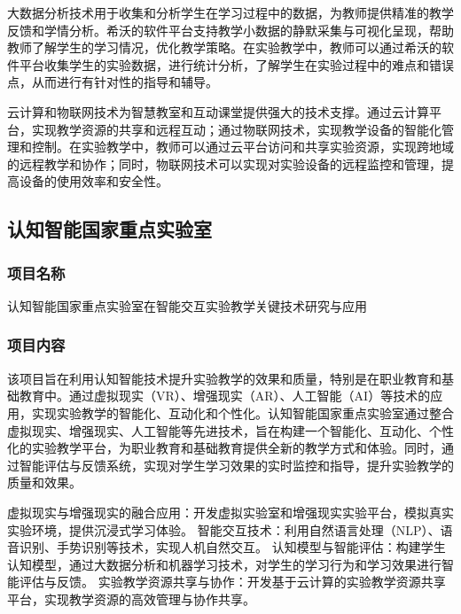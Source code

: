 大数据分析技术用于收集和分析学生在学习过程中的数据，为教师提供精准的教学反馈和学情分析。希沃的软件平台支持教学小数据的静默采集与可视化呈现，帮助教师了解学生的学习情况，优化教学策略。在实验教学中，教师可以通过希沃的软件平台收集学生的实验数据，进行统计分析，了解学生在实验过程中的难点和错误点，从而进行有针对性的指导和辅导。

云计算和物联网技术为智慧教室和互动课堂提供强大的技术支撑。通过云计算平台，实现教学资源的共享和远程互动；通过物联网技术，实现教学设备的智能化管理和控制。在实验教学中，教师可以通过云平台访问和共享实验资源，实现跨地域的远程教学和协作；同时，物联网技术可以实现对实验设备的远程监控和管理，提高设备的使用效率和安全性。

\subsection{认知智能国家重点实验室}

\subsubsection{项目名称}

认知智能国家重点实验室在智能交互实验教学关键技术研究与应用

\subsubsection{项目内容}


该项目旨在利用认知智能技术提升实验教学的效果和质量，特别是在职业教育和基础教育中。通过虚拟现实（VR）、增强现实（AR）、人工智能（AI）等技术的应用，实现实验教学的智能化、互动化和个性化。认知智能国家重点实验室通过整合虚拟现实、增强现实、人工智能等先进技术，旨在构建一个智能化、互动化、个性化的实验教学平台，为职业教育和基础教育提供全新的教学方式和体验。同时，通过智能评估与反馈系统，实现对学生学习效果的实时监控和指导，提升实验教学的质量和效果。

虚拟现实与增强现实的融合应用：开发虚拟实验室和增强现实实验平台，模拟真实实验环境，提供沉浸式学习体验。
智能交互技术：利用自然语言处理（NLP）、语音识别、手势识别等技术，实现人机自然交互。
认知模型与智能评估：构建学生认知模型，通过大数据分析和机器学习技术，对学生的学习行为和学习效果进行智能评估与反馈。
实验教学资源共享与协作：开发基于云计算的实验教学资源共享平台，实现教学资源的高效管理与协作共享。

